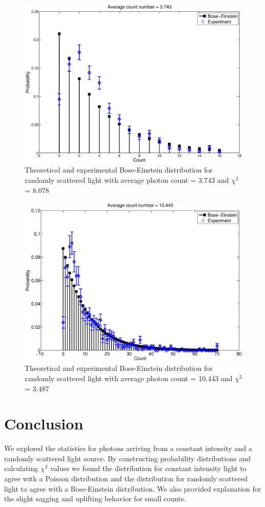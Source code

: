\begin{figure}[H]
  \includegraphics[totalheight=0.6\textwidth]{figs/pt3000}
  \caption{Theoretical and experimental Bose-Einstein distribution for randomly scattered light with average photon count = 3.743 and $\chi^{2}$ = 8.078}
  \label{pt3000}
\end{figure}

\begin{figure}[H]
  \includegraphics[totalheight=0.6\textwidth]{figs/pt10k}
  \caption{Theoretical and experimental Bose-Einstein distribution for randomly scattered light with average photon count = 10.443 and $\chi^{2}$ = 3.487}
  \label{pt10k}
\end{figure}

\section{Conclusion}
We explored the statistics for photons arriving from a constant intensity and a randomly scattered light source. By constructing probability distributions and calculating $\chi^{2}$ values we found the distribution for constant intensity light to agree with a Poisson distribution and the distribution for randomly scattered light to agree with a Bose-Einstein distribution. We also provided explanation for the slight sagging and uplifting behavior for small counts.



